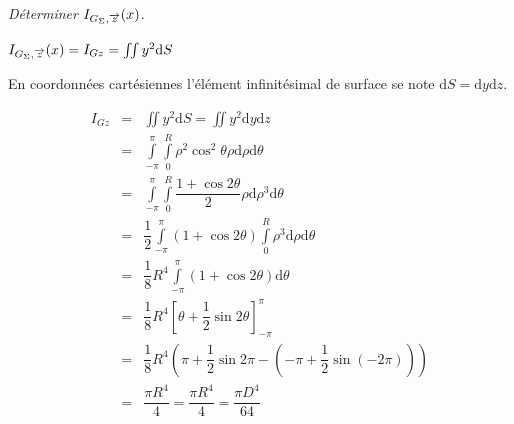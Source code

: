 \documentclass[10pt,fleqn]{article} %
\begin{document}
\subparagraph{}
\textit{Déterminer $I_{G_\Sigma,\overrightarrow{z}}(x)$.}
\ifprof
\begin{corrige}
$I_{G_\Sigma,\overrightarrow{z}}(x) = I_{Gz} = \iint y^2 \text{d}S$

En coordonnées cartésiennes l'élément infinitésimal de surface se note $\text{d}S = \text{d}y \text{d}z$.


\begin{eqnarray*}
I_{Gz} &=& \iint y^2 \text{d}S =\iint y^2 \text{d}y\text{d}z  \\
& = & 
\int\limits_{-\pi}^{\pi}\int\limits_0^{R} \rho^2\cos^2\theta \rho \text{d}\rho \text{d}\theta \\
&=& \int\limits_{-\pi}^{\pi}\int\limits_0^{R} \dfrac{1+\cos 2\theta}{2} \rho \text{d}\rho^3 \text{d}\theta  \\
& = & \dfrac{1}{2} \int\limits_{-\pi}^{\pi} \left( 1+\cos 2\theta \right) \int\limits_0^{R} \rho^3 \text{d}\rho \text{d}\theta \\
& = & \dfrac{1}{8}R^4 \int\limits_{-\pi}^{\pi} \left( 1+\cos 2\theta \right)  \text{d}\theta \\
& = & \dfrac{1}{8}R^4 \left[\theta + \dfrac{1}{2} \sin 2\theta \right]_{-\pi}^{\pi} \\
& = & \dfrac{1}{8}R^4 \left(\pi + \dfrac{1}{2} \sin 2\pi  - \left(-\pi+ \dfrac{1}{2} \sin \left(-2\pi\right)  \right) \right) \\
& = & \dfrac{\pi R^4}{4} = \dfrac{\pi R^4}{4}=\dfrac{\pi D^4}{64}
\end{eqnarray*}
%
%
\end{corrige}
\else 
\fi

\newpage
\end{document}
